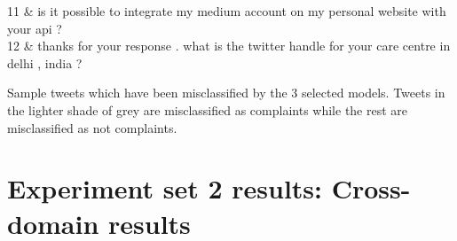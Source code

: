 \begin{table}
\begin{tblr}
        11                  & is it possible to integrate my medium account on my personal website with your api ?                                                                                                                                                                                \\
        12                  & thanks for your response . what is the twitter handle for your care centre in delhi , india ?
    \end{tblr}
    \caption{Sample tweets which have been misclassified by the 3 selected models. Tweets in the \colorbox{Mercury}{lighter shade of grey} are misclassified as complaints while the rest are misclassified as not complaints.}
    \label{fig: error_tweets}
\end{table}

\section{Experiment set 2 results: Cross-domain results}
